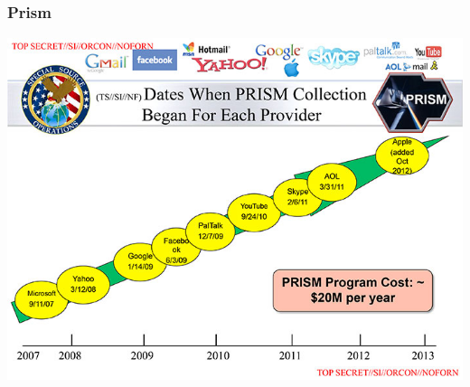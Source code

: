 \documentclass[12pt]{beamer}
\begin{document}
\subsection{}

\begin{frame}
    \frametitle{Prism}
    \includegraphics[height=0.7\textheight]{img/prism.jpg}
\end{frame}
\end{document}
